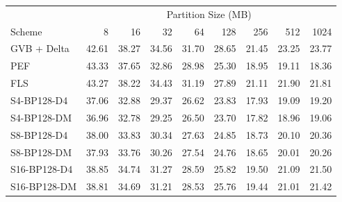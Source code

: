 \begin{tabular}{lrrrrrrrr}
\toprule
 & \multicolumn{8}{c}{Partition Size (MB)} \\
Scheme & 8 & 16 & 32 & 64 & 128 & 256 & 512 & 1024 \\
\midrule
GVB + Delta & 42.61 & 38.27 & 34.56 & 31.70 & 28.65 & 21.45 & 23.25 & 23.77 \\
PEF & 43.33 & 37.65 & 32.86 & 28.98 & 25.30 & 18.95 & 19.11 & 18.36 \\
FLS & 43.27 & 38.22 & 34.43 & 31.19 & 27.89 & 21.11 & 21.90 & 21.81 \\
S4-BP128-D4 & 37.06 & 32.88 & 29.37 & 26.62 & 23.83 & 17.93 & 19.09 & 19.20 \\
S4-BP128-DM & 36.96 & 32.78 & 29.25 & 26.50 & 23.70 & 17.82 & 18.96 & 19.06 \\
S8-BP128-D4 & 38.00 & 33.83 & 30.34 & 27.63 & 24.85 & 18.73 & 20.10 & 20.36 \\
S8-BP128-DM & 37.93 & 33.76 & 30.26 & 27.54 & 24.76 & 18.65 & 20.01 & 20.26 \\
S16-BP128-D4 & 38.85 & 34.74 & 31.27 & 28.59 & 25.82 & 19.50 & 21.09 & 21.50 \\
S16-BP128-DM & 38.81 & 34.69 & 31.21 & 28.53 & 25.76 & 19.44 & 21.01 & 21.42 \\
\bottomrule
\end{tabular}
